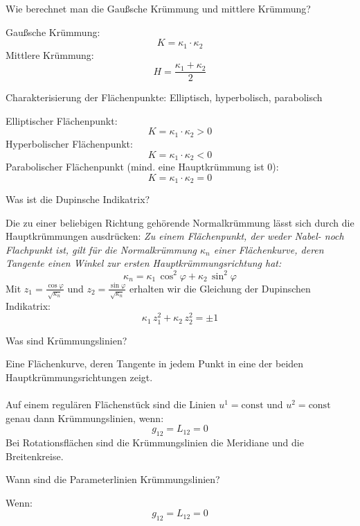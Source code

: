 \documentclass[twocolumn, fontsize=8pt, DIV=1]{scrartcl}
\begin{document}
\begin{framed}
    Wie berechnet man die Gaußsche Krümmung und mittlere Krümmung?
\end{framed}
Gaußsche Krümmung:
\[
    K = \kappa_1 \cdot \kappa_2
\]
Mittlere Krümmung:
\[
    H = \frac{\kappa_1 + \kappa_2}{2}
\]



\begin{framed}
    Charakterisierung der Flächenpunkte: Elliptisch, hyperbolisch, parabolisch
\end{framed}
Elliptischer Flächenpunkt:
\[
    K = \kappa_1 \cdot \kappa_2 > 0
\]
Hyperbolischer Flächenpunkt:
\[
    K = \kappa_1 \cdot \kappa_2 < 0
\]
Parabolischer Flächenpunkt (mind. eine Hauptkrümmung ist $0$):
\[
    K = \kappa_1 \cdot \kappa_2 = 0
\]



\begin{framed}
    Was ist die Dupinsche Indikatrix?
\end{framed}
Die zu einer beliebigen Richtung gehörende Normalkrümmung lässt sich durch die Hauptkrümmungen ausdrücken:
\textit{Zu einem Flächenpunkt, der weder Nabel- noch Flachpunkt ist, gilt für die Normalkrümmung $\kappa_n$ einer Flächenkurve, deren Tangente einen Winkel zur ersten Hauptkrümmungsrichtung hat:}
\[
    \kappa_n = \kappa_1\, \cos^2 \varphi + \kappa_2\, \sin^2 \varphi
\]
Mit $z_1 = \frac{\cos\varphi}{\sqrt{\kappa_n}}$ und $z_2 = \frac{\sin\varphi}{\sqrt{\kappa_n}}$ erhalten wir die Gleichung der Dupinschen Indikatrix:
\[
    \kappa_1\, z_1^2 + \kappa_2\, z_2^2 = \pm 1
\]


\begin{framed}
    Was sind Krümmungslinien?
\end{framed}
Eine Flächenkurve, deren Tangente in jedem Punkt in eine der beiden Hauptkrümmungsrichtungen zeigt.\\
\\
Auf einem regulären Flächenstück sind die Linien $u^1 = \text{const}$ und $u^2 = \text{const}$ genau dann Krümmungslinien, wenn:
\[
    g_{12} = L_{12} = 0
\]
Bei Rotationsflächen sind die Krümmungslinien die Meridiane und die Breitenkreise.



\begin{framed}
    Wann sind die Parameterlinien Krümmungslinien?
\end{framed}
Wenn:
\[
    g_{12} = L_{12} = 0
\]
\end{document}
